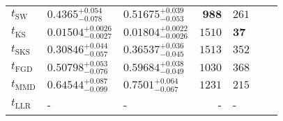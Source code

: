 \begin{tabular}{l|llr|llr}
	\midrule
	$t_{\mathrm{SW}}$ & $0.4365_{-0.078}^{+0.054}$ & $0.51675_{-0.053}^{+0.039}$ & ${\mathbf{988}}$ & $261$ \\
	$t_{\overline{\mathrm{KS}}}$ & ${\mathbf{0.01504_{-0.0027}^{+0.0026}}}$ & ${\mathbf{0.01804_{-0.0026}^{+0.0022}}}$ & $1510$ & ${\mathbf{37}}$ \\
	$t_{\mathrm{SKS}}$ & $0.30846_{-0.057}^{+0.044}$ & $0.36537_{-0.045}^{+0.036}$ & $1513$ & $352$ \\
	$t_{\mathrm{FGD}}$ & $0.50798_{-0.076}^{+0.053}$ & $0.59684_{-0.049}^{+0.038}$ & $1030$ & $368$ \\
	$t_{\mathrm{MMD}}$ & $0.64544_{-0.099}^{+0.087}$ & $0.7501_{-0.067}^{+0.064}$ & $1231$ & $215$ \\
	$t_{\mathrm{LLR}}$ & - & - & - & - \\
	\bottomrule
\end{tabular}